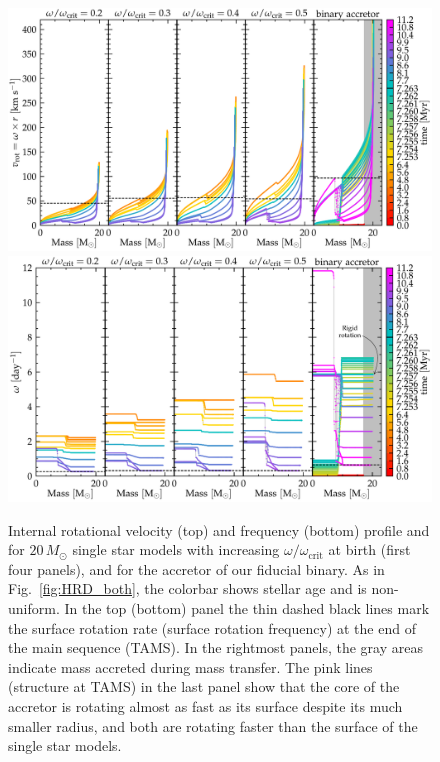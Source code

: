 \documentclass[twocolumn,twocolappendix,trackchanges]{aastex63}
\DeclareRobustCommand{\Figref}[1]{Fig.~\ref{#1}}
\begin{document}
\begin{figure}[tbp]
  \centering
  \includegraphics[width=\textwidth]{zeta_Rotational_struct_colored}
  \includegraphics[width=\textwidth]{omega_struct_colored}
  \caption{Internal rotational velocity (top) and frequency
    (bottom) profile and for $20\,M_\odot$ single star models with
    increasing $\omega/\omega_\mathrm{crit}$ at birth (first four
    panels), and for the accretor of our fiducial binary. As in
    \Figref{fig:HRD_both}, the colorbar shows stellar age and is non-uniform. In the top
    (bottom) panel the thin dashed black lines mark the surface
    rotation rate (surface rotation frequency) at the end of the main sequence (TAMS). In the rightmost
    panels, the gray areas indicate mass accreted during mass transfer. The
    pink lines (structure at TAMS) in the last panel show that the core of the
    accretor is rotating almost as fast as its surface despite its
    much smaller radius, and both are rotating faster than the surface of
    the single star models.}
  \label{fig:struct_rot}
\end{figure}
\end{document}

